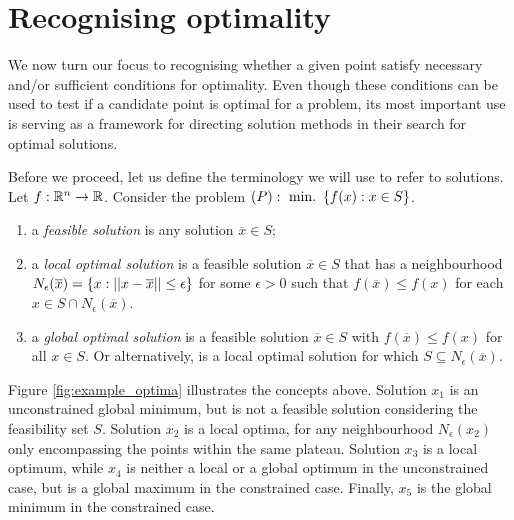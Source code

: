\section{Recognising optimality}

We now turn our focus to recognising whether a given point satisfy necessary and/or sufficient conditions for optimality. Even though these conditions can be used to test if a candidate point is optimal for a problem, its most important use is serving as a framework for directing solution methods in their search for optimal solutions. 

Before we proceed, let us define the terminology we will use to refer to solutions. Let $f:\mathbb{R}^n \to \mathbb{R}$. Consider the problem
$(P) :~ \mathop{\text{min.~}}\left\{ f(x) : x \in S \right \}$.
% 
\begin{enumerate}
\item a \emph{feasible solution} is any solution  $\overline{x} \in S$;
\item a \emph{local optimal solution} is a feasible solution $\overline{x}\in S$ that has a neighbourhood $N_\epsilon(\overline{x}) = \left\{ x : ||x - \overline{x}|| \leq \epsilon \right \}$ for some $\epsilon >0$ such that $f(\overline{x}) \leq f(x)$ for each $x \in S \cap N_\epsilon(\overline{x})$.
\item a \emph{global optimal solution} is a feasible solution $\overline{x} \in S$ with $f(\overline{x}) \leq f(x)$ for all $x \in S$. Or alternatively, is a local optimal solution for which $S \subseteq N_\epsilon(\overline{x})$.
\end{enumerate}
%
Figure \ref{fig:example_optima} illustrates the concepts above. Solution $x_1$ is an unconstrained global minimum, but is not a feasible solution considering the feasibility set $S$. Solution $x_2$ is a local optima, for any neighbourhood $N_\epsilon(x_2)$ only encompassing the points within the same plateau. Solution $x_3$ is a local optimum, while $x_4$ is neither a local or a global optimum in the unconstrained case, but is a global maximum in the constrained case. Finally, $x_5$ is the global minimum in the constrained case.

